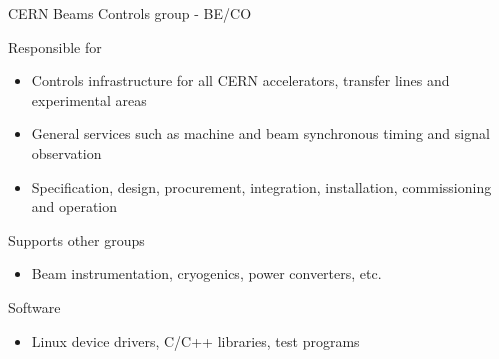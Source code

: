 \documentclass[compress,red]{beamer}
\begin{document}
\begin{frame}{CERN Beams Controls group - BE/CO}

  \begin{block}{Responsible for}
    \begin{itemize}
    \item Controls infrastructure for all CERN accelerators, transfer lines and experimental areas
    \item General services such as machine and beam synchronous timing and signal observation
    \item Specification, design, procurement, integration, installation, commissioning and operation
    \end{itemize}
  \end{block}

  \begin{block}{Supports other groups}
    \begin{itemize}
    \item Beam instrumentation, cryogenics, power converters, etc.
    \end{itemize}
  \end{block}

  \begin{block}{Software}
    \begin{itemize}
    \item Linux device drivers, C/C++ libraries, test programs
    \end{itemize}
  \end{block}

\end{frame}
\end{document}
